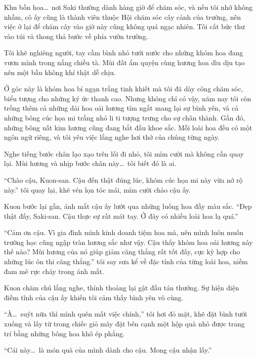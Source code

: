 \documentclass[../main.tex]{subfiles}
\begin{document}
Khu bồn hoa\dots\ nơi Saki thường dành hàng giờ để chăm sóc, và nếu tôi nhớ không nhầm, cô ấy cũng là thành viên thuộc Hội chăm sóc cây cảnh của trường, nên việc ở lại để chăm cây vào giờ này cũng không quá ngạc nhiên. Tôi cất bức thư vào túi và thong thả bước về phía vườn trường.

\ct


Tôi khẽ nghiêng người, tay cầm bình nhỏ tưới nước cho những khóm hoa đang vươn mình trong nắng chiều tà. Mùi đất ẩm quyện cùng hương hoa dìu dịu tạo nên một bầu không khí thật dễ chịu.

Ở góc này là khóm hoa bỉ ngạn trắng tinh khiết mà tôi đã dày công chăm sóc, biểu tượng cho những ký ức thanh cao. Nhưng không chỉ có vậy, năm nay tôi còn trồng thêm cả những dải hoa oải hương tím ngắt mang lại sự bình yên, và cả những bông cúc họa mi trắng nhỏ li ti tượng trưng cho sự chân thành. Gần đó, những bông uất kim hương cũng đang bắt đầu khoe sắc. Mỗi loài hoa đều có một ngôn ngữ riêng, và tôi yêu việc lắng nghe hơi thở của chúng từng ngày.

Nghe tiếng bước chân lạo xạo trên lối đi nhỏ, tôi mỉm cười mà không cần quay lại. Mùi hương và nhịp bước chân này\dots\ tôi biết đó là ai.

``Chào cậu, Kuon-san. Cậu đến thật đúng lúc, khóm cúc họa mi này vừa nở rộ này.'' tôi quay lại, khẽ vén lọn tóc mái, mỉm cười chào cậu ấy.

Kuon bước lại gần, ánh mắt cậu ấy lướt qua những luống hoa đầy màu sắc. ``Đẹp thật đấy, Saki-san. Cậu thực sự rất mát tay. Ở đây có nhiều loài hoa lạ quá.''

``Cảm ơn cậu. Vì gia đình mình kinh doanh tiệm hoa mà, nên mình luôn muốn trường học cũng ngập tràn hương sắc như vậy. Cậu thấy khóm hoa oải hương này thế nào? Mùi hương của nó giúp giảm căng thẳng rất tốt đấy, cực kỳ hợp cho những lúc ôn thi căng thẳng.'' tôi say sưa kể về đặc tính của từng loài hoa, niềm đam mê rực cháy trong ánh mắt.

Kuon chăm chú lắng nghe, thỉnh thoảng lại gật đầu tán thưởng. Sự hiện diện điềm tĩnh của cậu ấy khiến tôi cảm thấy bình yên vô cùng.

``À\dots\ suýt nữa thì mình quên mất việc chính,'' tôi hơi đỏ mặt, khẽ đặt bình tưới xuống và lấy từ trong chiếc giỏ mây đặt bên cạnh một hộp quà nhỏ được trang trí bằng những bông hoa khô ép phẳng.

``Cái này\dots\ là món quà của mình dành cho cậu. Mong cậu nhận lấy.''
\end{document}

